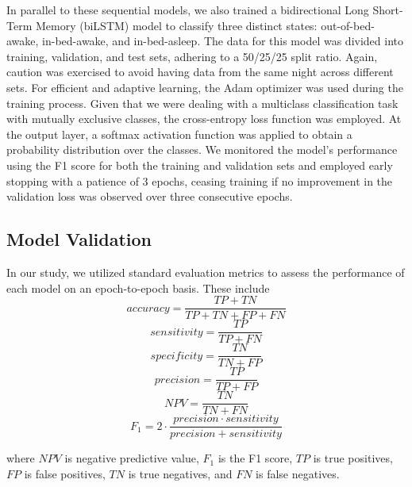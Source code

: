 \documentclass[
  9pt,
]{scrbook}
\begin{document}
In parallel to these sequential models, we also trained a bidirectional
Long Short-Term Memory (biLSTM) model to classify three distinct states:
out-of-bed-awake, in-bed-awake, and in-bed-asleep. The data for this
model was divided into training, validation, and test sets, adhering to
a 50/25/25 split ratio. Again, caution was exercised to avoid having
data from the same night across different sets. For efficient and
adaptive learning, the Adam optimizer was used during the training
process. Given that we were dealing with a multiclass classification
task with mutually exclusive classes, the cross-entropy loss function
was employed. At the output layer, a softmax activation function was
applied to obtain a probability distribution over the classes. We
monitored the model's performance using the F1 score for both the
training and validation sets and employed early stopping with a patience
of 3 epochs, ceasing training if no improvement in the validation loss
was observed over three consecutive epochs.

\hypertarget{model-validation}{%
\subsection{Model Validation}\label{model-validation}}

In our study, we utilized standard evaluation metrics to assess the
performance of each model on an epoch-to-epoch basis. These include
\[accuracy = \frac{TP+TN}{TP+TN+FP+FN}\]
\[sensitivity = \frac{TP}{TP+FN}\] \[specificity = \frac{TN}{TN+FP}\]
\[precision = \frac{TP}{TP+FP}\] \[NPV = \frac{TN}{TN + FN}\]
\[F_1 = 2 \cdot \frac{precision \cdot sensitivity}{precision + sensitivity}\]

where \(NPV\) is negative predictive value, \(F_1\) is the F1 score,
\(TP\) is true positives, \(FP\) is false positives, \(TN\) is true
negatives, and \(FN\) is false negatives.
\end{document}
